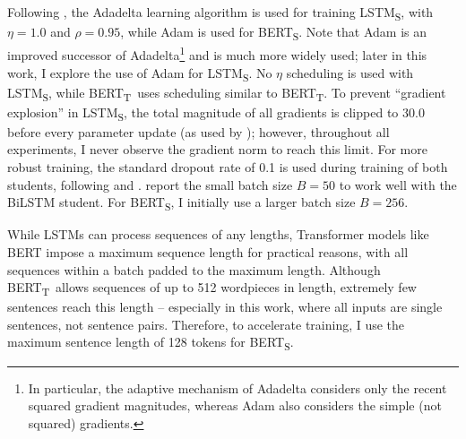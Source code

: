 \documentclass[bsc,frontabs,singlespacing,parskip,deptreport]{infthesis}
\def\BERTT{BERT\textsubscript{T}}
\def\BERTS{BERT\textsubscript{S}}
\def\LSTMS{LSTM\textsubscript{S}}
\begin{document}
{{{      %
      Following \citeauthor{Tang_2019b}, the Adadelta learning algorithm \citep{Zeiler_2012} is used for training \LSTMS, with $\eta=1.0$ and $\rho=0.95$, while Adam is used for \BERTS.
      Note that Adam is an improved successor of Adadelta\footnote{In particular, the adaptive mechanism of Adadelta considers only the recent squared gradient magnitudes, whereas Adam also considers the simple (not squared) gradients.} and is much more widely used; later in this work, I explore the use of Adam for \LSTMS. No $\eta$ scheduling is used with \LSTMS, while \BERTT~uses scheduling similar to \BERTT.
      To prevent ``gradient explosion'' in \LSTMS, the total magnitude of all gradients is clipped to 30.0 before every parameter update (as used by \citeauthor{Tang_2019b}); however, throughout all experiments, I never observe the gradient norm to reach this limit.
      For more robust training, the standard dropout rate of 0.1 is used during training of both students, following \citet{Devlin_2018} and \citeauthor{Tang_2019b}.
      \citeauthor{Tang_2019b} report the small batch size $B=50$ to work well with the BiLSTM student. For \BERTS, I initially use a larger batch size $B=256$.

      While LSTMs can process sequences of any lengths, Transformer models like BERT impose a maximum sequence length for practical reasons, with all sequences within a batch padded to the maximum length. Although \BERTT~allows sequences of up to 512 wordpieces in length, extremely few sentences reach this length -- especially in this work, where all inputs are single sentences, not sentence pairs. Therefore, to accelerate training, I use the maximum sentence length of 128 tokens for \BERTS.

}}}
\end{document}
